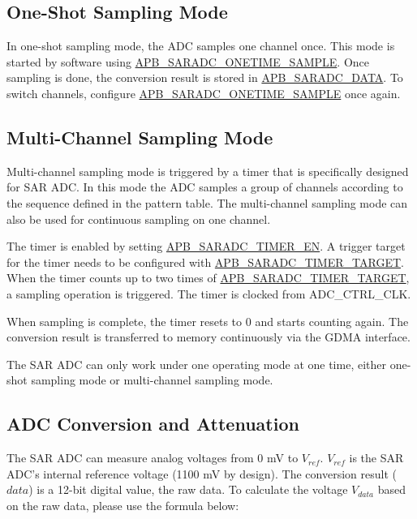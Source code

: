\documentclass[main\_\_EN.tex]{subfiles}
\begin{document}
\subsection{One-Shot Sampling Mode}
\label{sec:sar-adc-oneshot-sampling-mode}

In one-shot sampling mode, the ADC samples one channel once. This mode is started by software using \hyperref[fielddesc:APBSARADCONETIMESAMPLE]{APB\_SARADC\_ONETIME\_SAMPLE}. Once sampling is done, the conversion result is stored in \hyperref[fielddesc:APBSARADCDATA]{APB\_SARADC\_DATA}. To switch channels, configure \hyperref[fielddesc:APBSARADCONETIMESAMPLE]{APB\_SARADC\_ONETIME\_SAMPLE} once again.

\subsection{Multi-Channel Sampling Mode}
\label{sec:sar-adc-multi-channel-sampling-mode}

Multi-channel sampling mode is triggered by a timer that is specifically designed for SAR ADC. In this mode the ADC samples a group of channels according to the sequence defined in the pattern table. The multi-channel sampling mode can also be used for continuous sampling on one channel.

The timer is enabled by setting \hyperref[fielddesc:APBSARADCTIMEREN]{APB\_SARADC\_TIMER\_EN}. A trigger target for the timer needs to be configured with \hyperref[fielddesc:APBSARADCTIMERTARGET]{APB\_SARADC\_TIMER\_TARGET}. When the timer counts up to two times of \hyperref[fielddesc:APBSARADCTIMERTARGET]{APB\_SARADC\_TIMER\_TARGET}, a sampling operation is triggered. The timer is clocked from ADC\_CTRL\_CLK.

When sampling is complete, the timer resets to 0 and starts counting again. The conversion result is transferred to memory continuously via the GDMA interface.

\begin{tiplisting}
The SAR ADC can only work under one operating mode at one time, either one-shot sampling mode or multi-channel sampling mode.
\end{tiplisting}

\subsection{ADC Conversion and Attenuation}
\label{sec:sar-adc-conversion-and attenuation}

The SAR ADC can measure analog voltages from 0 mV to \(V_{ref}\). \(V_{ref}\) is the SAR ADC's internal reference voltage (1100 mV by design). The conversion result (\(data\)) is a 12-bit digital value, the raw data. To calculate the voltage \(V_{data}\) based on the raw data, please use the formula below:
\end{document}
